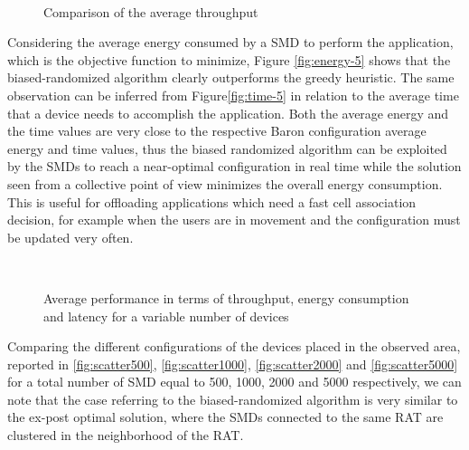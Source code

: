\documentclass[twoside,openright]{report}
\begin{document}
\begin{figure}[htbp]%
\centering
{}
\\
\caption{Comparison of the average throughput}
\label{fig:throughputComparison}
\end{figure}

Considering the average energy consumed by a \gls{SMD} to perform the application, which is the objective function to minimize, Figure \autoref{fig:energy-5} shows that the biased-randomized algorithm clearly outperforms the greedy heuristic. 
The same observation can be inferred from Figure\autoref{fig:time-5} in relation to the average time that a device needs to accomplish the application. 
Both the average energy and the time values are very close to the respective Baron configuration average energy and time values, thus the biased randomized algorithm can be exploited by the \glspl{SMD} to reach a near-optimal configuration in real time while the solution seen from a collective point of view minimizes the overall energy consumption. 
This is useful for  offloading applications which need a fast cell association decision, for example when the users are in movement and the configuration must be updated very often. 

\begin{figure}[htbp]
\label{fig:average-performance-5}
\centering
{}
\\
\caption{Average performance in terms of throughput, energy consumption and latency for a variable number of devices}
\end{figure}

Comparing the different configurations of the devices placed in the observed area, reported in \autoref{fig:scatter500}, \autoref{fig:scatter1000}, \autoref{fig:scatter2000} and \autoref{fig:scatter5000} for a total number of SMD equal to 500, 1000, 2000 and 5000 respectively, we can note that the case referring to the biased-randomized algorithm is very similar to the ex-post optimal solution, where the \glspl{SMD} connected to the same \gls{RAT} are clustered in the neighborhood of the \gls{RAT}.  
\end{document}
